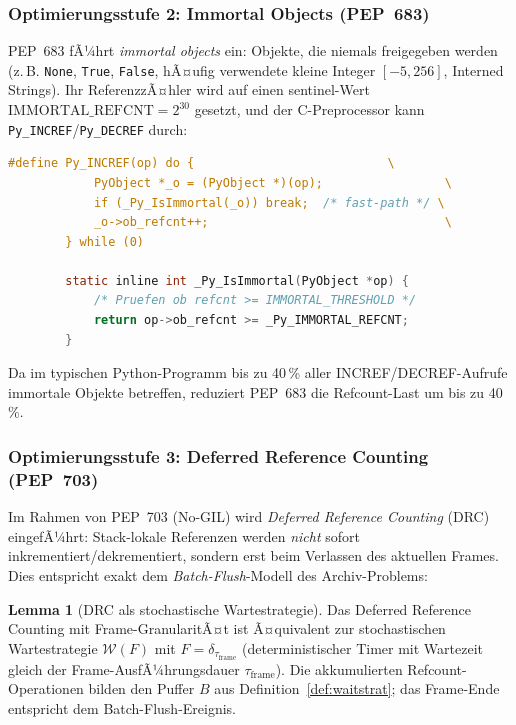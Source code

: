 ﻿\documentclass[a4paper,12pt]{scrreprt}
\theoremstyle{definition}
\newtheorem{lemma}{Lemma}[section]
\begin{document}
	\subsubsection{Optimierungsstufe 2: Immortal Objects (PEP~683)}
	
	PEP~683 \cite{pep683} fÃ¼hrt \emph{immortal objects} ein: Objekte, die
	niemals freigegeben werden (z.\,B. \texttt{None}, \texttt{True},
	\texttt{False}, hÃ¤ufig verwendete kleine Integer $[-5, 256]$,
	Interned Strings). Ihr ReferenzzÃ¤hler wird auf einen sentinel-Wert
	$\mathrm{IMMORTAL\_REFCNT} = 2^{30}$ gesetzt, und der C-Preprocessor
	kann \texttt{Py\_INCREF}/\texttt{Py\_DECREF} durch:
	
	\begin{lstlisting}[language=C, caption={Immortal Object Check: INCREF wird wegoptimiert},
		label=lst:immortal]
		#define Py_INCREF(op) do {                           \
			PyObject *_o = (PyObject *)(op);                 \
			if (_Py_IsImmortal(_o)) break;  /* fast-path */ \
			_o->ob_refcnt++;                                 \
		} while (0)
		
		static inline int _Py_IsImmortal(PyObject *op) {
			/* Pruefen ob refcnt >= IMMORTAL_THRESHOLD */
			return op->ob_refcnt >= _Py_IMMORTAL_REFCNT;
		}
	\end{lstlisting}
	
	Da im typischen Python-Programm bis zu 40\,\% aller INCREF/DECREF-Aufrufe
	immortale Objekte betreffen, reduziert PEP~683 die Refcount-Last
	um bis zu 40\,\%.
	
	\subsubsection{Optimierungsstufe 3: Deferred Reference Counting (PEP~703)}
	
	Im Rahmen von PEP~703 (No-GIL) \cite{pep703} wird \emph{Deferred
		Reference Counting} (DRC) eingefÃ¼hrt: Stack-lokale Referenzen werden
	\emph{nicht} sofort inkrementiert/dekrementiert, sondern erst beim
	Verlassen des aktuellen Frames. Dies entspricht exakt dem
	\emph{Batch-Flush}-Modell des Archiv-Problems:
	
	\begin{lemma}[DRC als stochastische Wartestrategie]
		\label{lemma:drc_archiv}
		Das Deferred Reference Counting mit Frame-GranularitÃ¤t ist
		Ã¤quivalent zur stochastischen Wartestrategie $\mathcal{W}(F)$
		mit $F = \delta_{\tau_{\mathrm{frame}}}$ (deterministischer Timer
		mit Wartezeit gleich der Frame-AusfÃ¼hrungsdauer $\tau_{\mathrm{frame}}$).
		Die akkumulierten Refcount-Operationen bilden den Puffer $B$ aus
		Definition~\ref{def:waitstrat}; das Frame-Ende entspricht dem
		Batch-Flush-Ereignis.
	\end{lemma}
	
\end{document}
